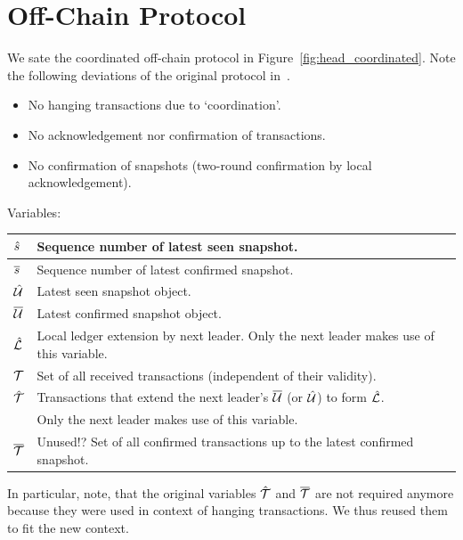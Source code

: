 \section{Off-Chain Protocol}

We sate the coordinated off-chain protocol in Figure~\ref{fig:head_coordinated}.
Note the following deviations of the original protocol in~\cite{hydrahead20}.

\begin{itemize}
\item No hanging transactions due to `coordination'.
\item No acknowledgement nor confirmation of transactions.
\item No confirmation of snapshots (two-round confirmation by local acknowledgement).
\end{itemize}

Variables:

\begin{center}
\begin{tabular}{|l|l|}\hline
  $\hat s$  & Sequence number of latest seen snapshot. \\ \hline
  $\overline s$  & Sequence number of latest confirmed snapshot. \\ \hline
  $\hat {\mathcal U}$ & Latest seen snapshot object. \\ \hline
  $\overline {\mathcal U}$ & Latest confirmed snapshot object. \\ \hline
  $\hat {\mathcal L}$ & Local ledger extension by next leader. Only the next leader
  makes use of this variable.\\ \hline
  ${\mathcal T}$    & Set of all received transactions (independent of their validity).\\  \hline
  $\hat {\mathcal T}$ & Transactions that extend the next leader's $\overline {\mathcal U}$ (or $\hat {\mathcal U}$) to form $\hat {\mathcal L}$.\\
           & Only the next leader makes use of this variable.\\  \hline
  $\overline {\mathcal T}$ & Unused!? Set of all confirmed transactions up to the latest confirmed snapshot.\\  \hline
\end{tabular}
\end{center}

In particular, note, that the original variables $\hat {\mathcal T}$ and $\overline {\mathcal T}$ are not required anymore because they
were used in context of hanging transactions. We thus reused them to fit the new context.



